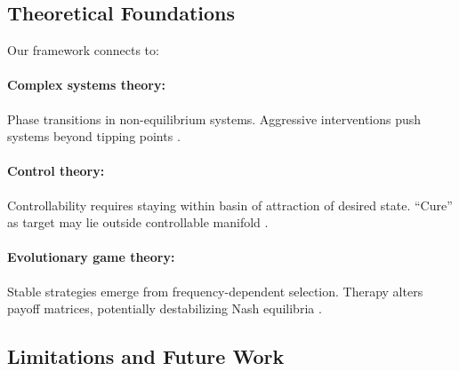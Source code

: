 \documentclass[11pt,a4paper]{article}
\begin{document}
\subsection{Theoretical Foundations}

Our framework connects to:

\paragraph{Complex systems theory:} Phase transitions in non-equilibrium systems. Aggressive interventions push systems beyond tipping points \citep{scheffer2001catastrophic}.

\paragraph{Control theory:} Controllability requires staying within basin of attraction of desired state. ``Cure'' as target may lie outside controllable manifold \citep{liu2011controllability}.

\paragraph{Evolutionary game theory:} Stable strategies emerge from frequency-dependent selection. Therapy alters payoff matrices, potentially destabilizing Nash equilibria \citep{basanta2012evolutionary}.

\subsection{Limitations and Future Work}
\end{document}
